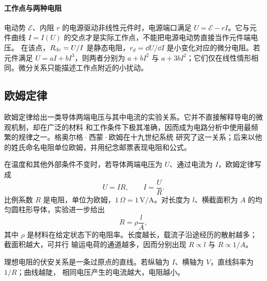 {%
\paragraph{工作点与两种电阻}
电动势 $\mathcal E$、内阻 $r$ 的电源驱动非线性元件时，电源端口满足 $U=\mathcal E-rI$。它与元件曲线 $I=I(U)$ 的交点才是实际工作点，不能把电源电动势直接当作元件端电压。
在该点，$R_{\rm dc}=U/I$ 是静态电阻，$r_d=\dd U/\dd I$ 是小变化对应的微分电阻。若元件满足 $U=aI+bI^3$，则两者分别为 $a+bI^2$ 与 $a+3bI^2$；它们仅在线性情形相同。微分关系只能描述工作点附近的小扰动。


\subsection{欧姆定律}


欧姆定律给出一类导体两端电压与其中电流的实验关系。它并不直接解释导电的微观机制，却在广泛的材料
和工作条件下极其准确，因而成为电路分析中使用最频繁的规律之一。格奥尔格·西蒙·欧姆在十九世纪系统
研究了这一关系；后来以他的姓氏命名电阻单位欧姆，并用纪念邮票表现电阻和公式。

\ohmHistoryFigure

在温度和其他外部条件不变时，若导体两端电压为 $U$、通过电流为 $I$，欧姆定律写成
\begin{equation}
  \boxed{U=IR,\qquad I=\frac UR}.
\end{equation}
比例系数 $R$ 是电阻，单位为欧姆，$1\,\Omega=1\,\mathrm V/\mathrm A$。对长度为 $l$、横截面积为
$A$ 的均匀圆柱形导体，实验进一步给出
\begin{equation}
  \boxed{R=\rho\frac lA},
\end{equation}
其中 $\rho$ 是材料在给定状态下的电阻率。长度越长，载流子沿途经历的散射越多；截面积越大，可并行
输运电荷的通道越多，因而分别出现 $R\propto l$ 与 $R\propto1/A$。

\par\noindent\begin{minipage}{\linewidth}
\cylindricalResistorFigure
{}
\end{minipage}\par\medskip

理想电阻的伏安关系是一条过原点的直线。若纵轴为 $I$、横轴为 $V$，直线斜率为 $1/R$；曲线越陡，
相同电压产生的电流越大，电阻越小。

\par\noindent\begin{minipage}{\linewidth}
\ohmicIVFigure
{}
\end{minipage}\par\medskip

}
